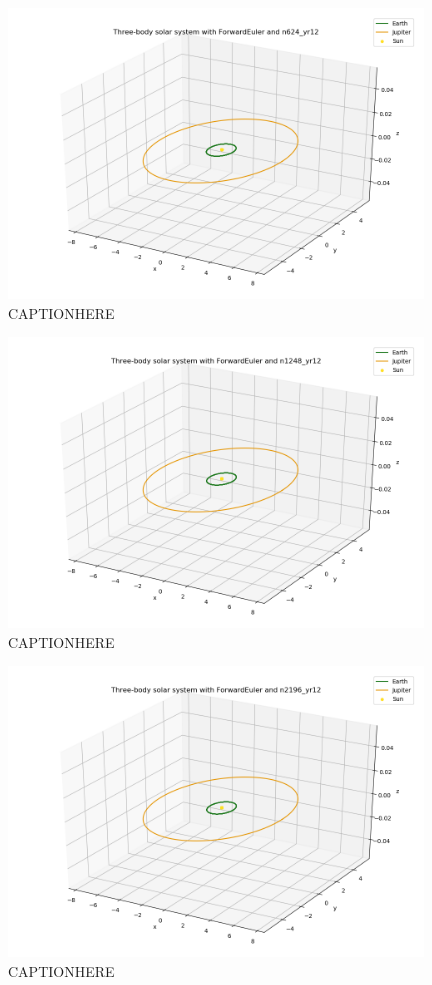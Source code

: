 \documentclass{article}
\begin{document}
    \begin{figure}[H]
        \centering
        \includegraphics[width = 11cm]{img/plot3D_S_E_J_F_n624_yr12.png}
        \caption{CAPTIONHERE}
        \label{fig:plot3D_S_E_J_F_624_yr12}
    \end{figure}

    \begin{figure}[H]
        \centering
        \includegraphics[width = 11cm]{img/plot3D_S_E_J_F_n1248_yr12.png}
        \caption{CAPTIONHERE}
        \label{fig:plot3D_S_E_J_F_n1248_yr12}
    \end{figure}

    \begin{figure}[H]
        \centering
        \includegraphics[width = 11cm]{img/plot3D_S_E_J_F_n2196_yr12.png}
        \caption{CAPTIONHERE}
        \label{fig:plot3D_S_E_J_F_n2196_yr12}
    \end{figure}
\end{document}
